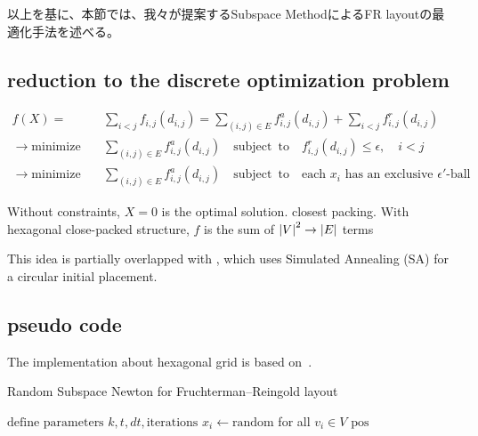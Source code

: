 \documentclass[dvipdfmx,journal]{IEEEtran}
\begin{document}
以上を基に、本節では、我々が提案するSubspace MethodによるFR layoutの最適化手法を述べる。

\subsection{reduction to the discrete optimization problem}\label{ssec:reduction}

\begin{align*}
  f(X) =                      & \sum_{i<j} f_{i,j}(d_{i,j}) = \sum_{(i,j)\in E} f^a_{i,j}(d_{i,j}) + \sum_{i<j} f^r_{i,j}(d_{i,j})                                \\
  \to \mathrm{minimize} \quad & \sum_{(i,j)\in E} f^a_{i,j}(d_{i,j}) \quad \mathrm{subject \enspace to} \quad f^r_{i,j}(d_{i,j}) \leq \epsilon, \quad i<j         \\
  \to \mathrm{minimize} \quad & \sum_{(i,j)\in E} f^a_{i,j}(d_{i,j}) \quad \mathrm{subject \enspace to} \quad \text{each $x_i$ has an exclusive $\epsilon'$-ball}
\end{align*}

Without constraints, $X=0$ is the optimal solution.
closest packing.
With hexagonal close-packed structure, $f$ is the sum of $\abs{V}^2 \to \abs{E}$ terms

This idea is partially overlapped with \cite{ghassemitoosiSimulatedAnnealingPreProcessing2016,s22145179}, which uses Simulated Annealing (SA) for a circular initial placement.

\subsection{pseudo code}\label{ssec:pseudoCode}

The implementation about hexagonal grid is based on~\cite{patelHexagonalGrids2013}.

\begin{algorithm}[ht]
  \caption{Random Subspace Newton for Fruchterman--Reingold layout}
  \label{alg:rsn}

  $\text{define parameters } k, t, dt, \text{iterations}$\;
  $x_i \gets \text{random}$ for all $v_i \in V$\;
  \Return $\text{pos}$
\end{algorithm}
\end{document}
